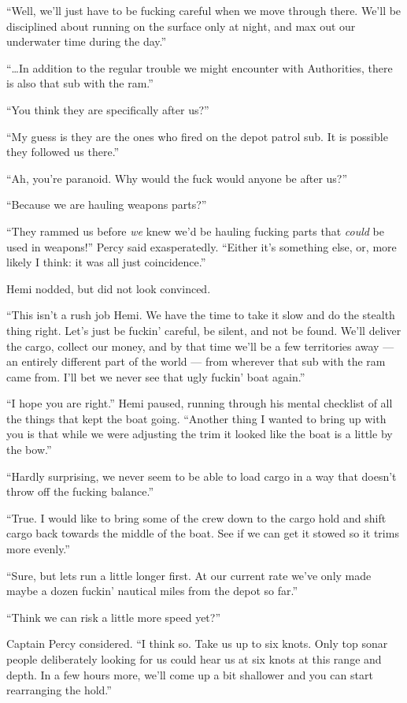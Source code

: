 \documentclass[]{scrbook}
\begin{document}
``Well, we'll just have to be fucking careful when we move through
there. We'll be disciplined about running on the surface only at night,
and max out our underwater time during the day.''

``\ldots{}In addition to the regular trouble we might encounter with
Authorities, there is also that sub with the ram.''

``You think they are specifically after us?''

``My guess is they are the ones who fired on the depot patrol sub. It is
possible they followed us there.''

``Ah, you're paranoid. Why would the fuck would anyone be after us?''

``Because we are hauling weapons parts?''

``They rammed us before \emph{we} knew we'd be hauling fucking parts
that \emph{could} be used in weapons!'' Percy said exasperatedly.
``Either it's something else, or, more likely I think: it was all just
coincidence.''

Hemi nodded, but did not look convinced.

``This isn't a rush job Hemi. We have the time to take it slow and do
the stealth thing right. Let's just be fuckin' careful, be silent, and
not be found. We'll deliver the cargo, collect our money, and by that
time we'll be a few territories away --- an entirely different part of
the world --- from wherever that sub with the ram came from. I'll bet we
never see that ugly fuckin' boat again.''

``I hope you are right.'' Hemi paused, running through his mental
checklist of all the things that kept the boat going. ``Another thing I
wanted to bring up with you is that while we were adjusting the trim it
looked like the boat is a little by the bow.''

``Hardly surprising, we never seem to be able to load cargo in a way
that doesn't throw off the fucking balance.''

``True. I would like to bring some of the crew down to the cargo hold
and shift cargo back towards the middle of the boat. See if we can get
it stowed so it trims more evenly.''

``Sure, but lets run a little longer first. At our current rate we've
only made maybe a dozen fuckin' nautical miles from the depot so far.''

``Think we can risk a little more speed yet?''

Captain Percy considered. ``I think so. Take us up to six knots. Only
top sonar people deliberately looking for us could hear us at six knots
at this range and depth. In a few hours more, we'll come up a bit
shallower and you can start rearranging the hold.''
\end{document}
